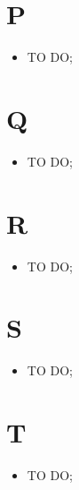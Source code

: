 %


\section*{P} %
\label{sec:p}
	\begin{itemize}
		\item TO DO;
	\end{itemize}

\section*{Q} %
\label{sec:q}
	\begin{itemize}
		\item TO DO;
	\end{itemize}

\section*{R} %
\label{sec:r}
	\begin{itemize}
		\item TO DO;
	\end{itemize}

\section*{S} %
\label{sec:s}
	\begin{itemize}
		\item TO DO;
	\end{itemize}

\section*{T} %
\label{sec:t}
	\begin{itemize}
		\item TO DO;
	\end{itemize}
